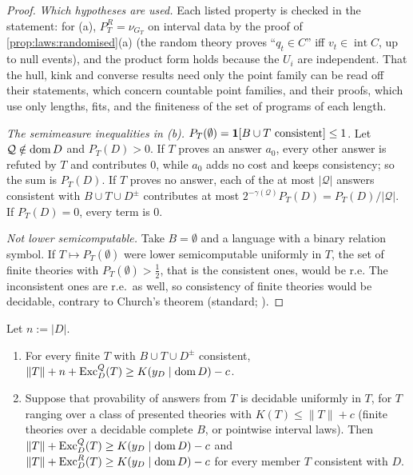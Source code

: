 \begin{proof}
\emph{Which hypotheses are used.} Each listed property is checked in the statement: for (a), $P^R_T=\nu_{G_T}$ on interval data by the proof of \cref{prop:laws:randomised}(a) (the random theory proves ``$q_t\in C$'' iff $v_t\in\operatorname{int}C$, up to null events), and the product form holds because the $U_i$ are independent. That the hull, kink and converse results need only the point family can be read off their statements, which concern countable point families, and their proofs, which use only lengths, fits, and the finiteness of the set of programs of each length.

\emph{The semimeasure inequalities in (b).} $P_T(\emptyset)=\mathbf{1}[B\cup T\text{ consistent}]\le1$. Let $\mathcal Q\notin\operatorname{dom} D$ and $P_T(D)>0$. If $T$ proves an answer $a_0$, every other answer is refuted by $T$ and contributes $0$, while $a_0$ adds no cost and keeps consistency; so the sum is $P_T(D)$. If $T$ proves no answer, each of the at most $\lvert\mathcal Q\rvert$ answers consistent with $B\cup T\cup D^\pm$ contributes at most $2^{-\gamma(\mathcal Q)}P_T(D)=P_T(D)/\lvert\mathcal Q\rvert$. If $P_T(D)=0$, every term is $0$.

\emph{Not lower semicomputable.} Take $B=\emptyset$ and a language with a binary relation symbol. If $T\mapsto P_T(\emptyset)$ were lower semicomputable uniformly in $T$, the set of finite theories with $P_T(\emptyset)>\frac12$, that is the consistent ones, would be r.e. The inconsistent ones are r.e.\ as well, so consistency of finite theories would be decidable, contrary to Church's theorem (standard; \citealp{church1936note}).
\end{proof}

\begin{proposition}\label{prop:laws:codingbound}
Let $n:=\lvert D\rvert$.
\begin{enumerate}[label=(\alph*),itemsep=1pt,topsep=2pt]
\item For every finite $T$ with $B\cup T\cup D^\pm$ consistent, $\lVert T\rVert+n+\mathrm{Exc}^Q_D(T)\ge K(y_D\mid\operatorname{dom} D)-c$.
\item Suppose that provability of answers from $T$ is decidable uniformly in $T$, for $T$ ranging over a class of presented theories with $K(T)\le\lVert T\rVert+c$ (finite theories over a decidable complete $B$, or pointwise interval laws). Then $\lVert T\rVert+\mathrm{Exc}^Q_D(T)\ge K(y_D\mid\operatorname{dom} D)-c$ and $\lVert T\rVert+\mathrm{Exc}^R_D(T)\ge K(y_D\mid\operatorname{dom} D)-c$ for every member $T$ consistent with $D$.
\end{enumerate}
\end{proposition}

